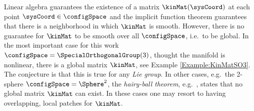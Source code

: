 Linear algebra guarantees the existence of a matrix $\kinMat(\sysCoord)$ at each point $\sysCoord\in\configSpace$ and the implicit function theorem guarantees that there is a neighborhood in which $\kinMat$ is smooth. 
However, there is no guarantee for $\kinMat$ to be smooth over all $\configSpace$, i.e.\ to be global.
In the most important case for this work $\configSpace=\SpecialOrthogonalGroup(3)$, thought the manifold is nonlinear, there is a global matrix $\kinMat$, see Example \autoref{Example:KinMatSO3}.
The conjecture is that this is true for any \textit{Lie group}.
In other cases, e.g.\ the 2-sphere $\configSpace = \Sphere^2$, the \textit{hairy-ball theorem}, e.g.\ \cite{Poincare:HairyBall}, states that no global matrix $\kinMat$ can exist.
In these cases one may resort to having overlapping, local patches for $\kinMat$.

